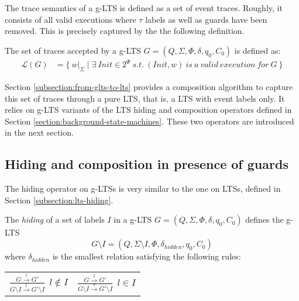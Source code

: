 The trace semantics of a g-LTS is defined as a set of event traces. Roughly, it consists of all valid executions where $\tau$ labels as well as guards have been removed. This is precisely captured by the the following definition.

\begin{definition}
The set of traces accepted by a g-LTS $G = (Q,\Sigma,\Phi,\delta,q_{0},C_{0})$ is defined as:
\begin{align*}
\mathcal{L}(G) &= \{~w|_{\Sigma} \mid \exists~Init \in 2^\Phi~s.t.~(Init,w)~is~a~valid~execution~for~G~\}
\end{align*}
\end{definition}

Section \ref{subsection:from-glts-to-lts} provides a composition algorithm to capture this set of traces through a pure LTS, that is, a LTS with event labels only. It relies on g-LTS variants of the LTS hiding and composition operators defined in Section \ref{section:background-state-machines}. These two operators are introduced in the next section.

\subsection{Hiding and composition in presence of guards}

The hiding operator on g-LTSs is very similar to the one on LTSs, defined in Section \ref{subsection:lts-hiding}. 

\begin{definition}
The \emph{hiding} of a set of labels $I$ in a g-LTS $G = (Q,\Sigma,\Phi,\delta,q_{0},C_{0})$ defines the g-LTS
\begin{equation*}
G \setminus I = (Q,\Sigma \setminus I,\Phi,\delta_{hidden},q_{0},C_0)
\end{equation*}
\noindent where $\delta_{hidden}$ is the smallest relation satisfying the following rules:
\begin{center}
\begin{tabular}{cc}
$\frac{\displaystyle G \stackrel{l}{\longrightarrow} G'}{\displaystyle G \setminus I \stackrel{l}{\longrightarrow} G' \setminus I}~~l \notin I$ & 
$\frac{\displaystyle G \stackrel{l}{\longrightarrow} G'}{\displaystyle G \setminus I \stackrel{\tau}{\longrightarrow} G' \setminus I}~~l \in I$ \\
\end{tabular}
\end{center}
\end{definition}

